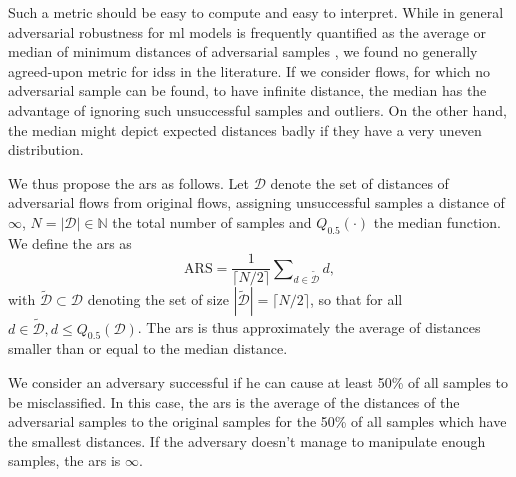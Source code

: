 \documentclass[conference]{IEEEtran}
\begin{document}
Such a metric should be easy to compute and easy to interpret.
While in general adversarial robustness for \gls{ml} models is frequently quantified as the average or median of minimum distances of adversarial samples \cite{carlini_evaluating_2019}, we found no generally agreed-upon metric for \glspl{ids} in the literature. If we consider flows, for which no adversarial sample can be found, to have infinite distance, the median has the advantage of ignoring such unsuccessful samples and outliers. On the other hand, the median might depict expected distances badly if they have a very uneven distribution. 

We thus propose the \gls{ars} as follows. Let $\mathcal D$ denote the set of distances of adversarial flows from original flows, assigning unsuccessful samples a distance of $\infty$, $N = | \mathcal D | \in \mathbb N$ the total number of samples and $Q_{0.5}(\cdot)$ the median function.
We define the \gls{ars} as 
\begin{equation}
\text{ARS} = \frac{1}{\lceil N/2 \rceil} \sum\nolimits_{d \in \tilde {\mathcal D}} d,
\end{equation}
with $\tilde {\mathcal D} \subset \mathcal D$ denoting the set of size $|\tilde {\mathcal D}| =\lceil N/2 \rceil$, so that for all $d \in  \tilde {\mathcal D}, d \le Q_{0.5}(\mathcal D)$.
The \gls{ars} is thus approximately the average of distances smaller than or equal to the median distance.

We consider an adversary successful if he can cause at least 50\% of all samples to be misclassified. In this case, the \gls{ars} is the average of the distances of the adversarial samples to the original samples for the 50\% of all samples which have the smallest distances. If the adversary doesn't manage to manipulate enough samples, the \gls{ars} is $\infty$.
\end{document}
